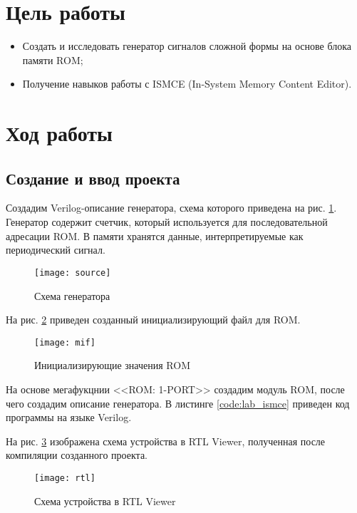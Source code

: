 





\tableofcontents
\newpage

\section{Цель работы}

\begin{itemize}
	\item Создать и исследовать генератор сигналов сложной формы на основе блока памяти ROM;
	\item Получение навыков работы с ISMCE (In-System Memory Content Editor).
\end{itemize}

\section{Ход работы}

\subsection{Создание и ввод проекта}

Создадим Verilog-описание генератора, схема которого приведена на рис. \ref{fig:source}. Генератор содержит счетчик, который используется для последовательной адресации ROM. В памяти хранятся данные, интерпретируемые как периодический сигнал.
\begin{figure}[H]
	\centering
	\texttt{[image: source]}
	\caption{Схема генератора}
	\label{fig:source}
\end{figure}

\noindent На рис. \ref{fig:mif} приведен созданный инициализирующий файл  для ROM. 
\begin{figure}[H]
	\centering
	\texttt{[image: mif]}
	\caption{Инициализирующие значения ROM}
	\label{fig:mif}
\end{figure}

На основе мегафукцнии <<ROM: 1-PORT>> создадим модуль ROM, после чего создадим описание генератора. В листинге \ref{code:lab_ismce} приведен код программы на языке Verilog.



На рис. \ref{fig:rtl} изображена схема устройства в RTL Viewer, полученная после компиляции созданного проекта.
\begin{figure}[H]
	\centering
	\texttt{[image: rtl]}
	\caption{Схема устройства в RTL Viewer}
	\label{fig:rtl}
\end{figure}

